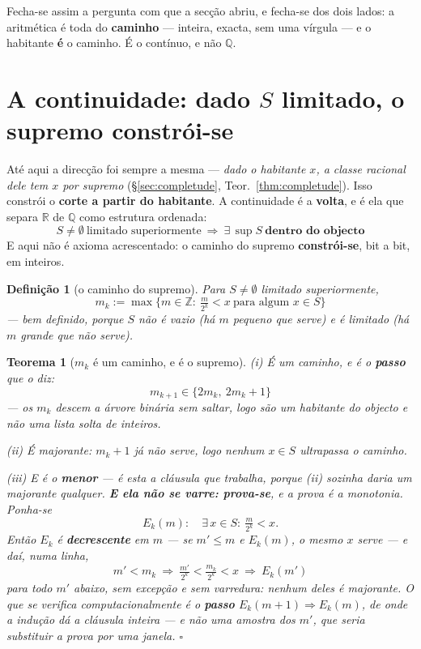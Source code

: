 \documentclass[11pt,a4paper]{article}
\newtheorem{teorema}{Teorema}
\newtheorem{definicao}{Definição}
\begin{document}
\medskip
\noindent Fecha-se assim a pergunta com que a secção abriu, e fecha-se dos dois
lados: a aritmética é toda do \textbf{caminho} --- inteira, exacta, sem uma
vírgula --- e o habitante \textbf{é} o caminho. É o contínuo, e não $\mathbb{Q}$.

\section{A continuidade: dado $S$ limitado, o supremo constrói-se}\label{sec:supremo}

\noindent Até aqui a direcção foi sempre a mesma --- \emph{dado o habitante $x$, a
classe racional dele tem $x$ por supremo} (\S\ref{sec:completude},
Teor.~\ref{thm:completude}). Isso constrói o \textbf{corte a partir do habitante}.
A continuidade é a \textbf{volta}, e é ela que separa $\mathbb{R}$ de $\mathbb{Q}$
como estrutura ordenada:
\[
\boxed{\;S\neq\emptyset\ \text{limitado superiormente}
\ \Longrightarrow\ \exists\,\sup S\ \textbf{dentro do objecto}\;}
\]
E aqui não é axioma acrescentado: o caminho do supremo \textbf{constrói-se}, bit a
bit, em inteiros.

\begin{definicao}[o caminho do supremo]\label{def:supremo}
Para $S\neq\emptyset$ limitado superiormente,
\[
m_k:=\max\bigl\{m\in\mathbb{Z}:\ \tfrac{m}{2^{k}}<x\ \text{para algum }x\in S\bigr\}
\]
--- bem definido, porque $S$ não é vazio (há $m$ pequeno que serve) e é limitado
(há $m$ grande que não serve).
\end{definicao}

\begin{teorema}[$m_k$ é um caminho, e é o supremo]\label{thm:supremo}
\emph{(i) É um caminho}, e é o \textbf{passo} que o diz:
\[
\boxed{\;m_{k+1}\in\{2m_k,\ 2m_k+1\}\;}
\]
--- os $m_k$ descem a árvore binária \emph{sem saltar}, logo são um habitante do
objecto e não uma lista solta de inteiros.

\emph{(ii) É majorante:} $m_k+1$ já não serve, logo nenhum $x\in S$ ultrapassa o
caminho.

\emph{(iii) E é o \textbf{menor}} --- é esta a cláusula que trabalha, porque (ii)
sozinha daria um majorante qualquer. \textbf{E ela não se varre: prova-se}, e a prova é
a \emph{monotonia}. Ponha-se
\[
E_k(m):\quad \exists\,x\in S:\ \tfrac{m}{2^{k}}<x .
\]
Então $E_k$ é \textbf{decrescente} em $m$ --- se $m'\leq m$ e $E_k(m)$, o mesmo $x$
serve --- e daí, numa linha,
\[
\boxed{\;m'<m_k\ \Longrightarrow\ \tfrac{m'}{2^{k}}<\tfrac{m_k}{2^{k}}<x
\ \Longrightarrow\ E_k(m')\;}
\]
para \emph{todo} $m'$ abaixo, sem excepção e sem varredura: nenhum deles é majorante.
\emph{O que se verifica computacionalmente é o \textbf{passo}} $E_k(m+1)\Rightarrow
E_k(m)$, de onde a indução dá a cláusula inteira --- e não uma amostra dos $m'$, que
seria substituir a prova por uma janela. $\square$
\end{teorema}
\end{document}
